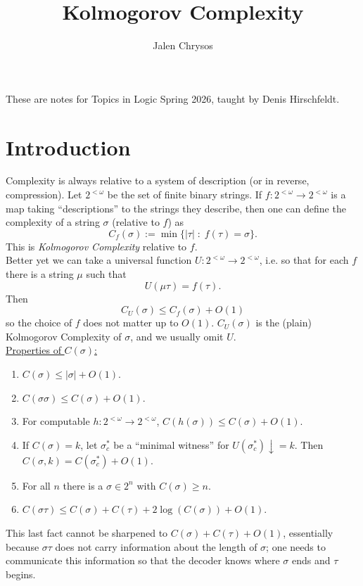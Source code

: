 \documentclass{amsart}
\title{Kolmogorov Complexity}
\author{Jalen Chrysos}
\begin{document}
	
	\maketitle
	
	These are notes for Topics in Logic Spring 2026, taught by Denis Hirschfeldt.
	
	\tableofcontents

	\newpage 
	
	\section{Introduction}
	
	Complexity is always relative to a system of description (or in reverse, compression). Let $2^{<\omega}$ be the set of finite binary strings. If $f:2^{<\omega}\to 2^{<\omega}$ is a map taking ``descriptions'' to the strings they describe, then one can define the complexity of a string $\sigma$ (relative to $f$) as 
	$$C_f(\sigma) := \min\{|\tau| \; : \; f(\tau) = \sigma\}.$$
	This is \textit{Kolmogorov Complexity} relative to $f$.\\
	
	Better yet we can take a universal function $U:2^{<\omega}\to 2^{<\omega}$, i.e. so that for each $f$ there is a string $\mu$ such that
	$$
	U(\mu \tau) = f(\tau).
	$$
	Then 
	$$
	C_U(\sigma) \leq C_f(\sigma) + O(1)
	$$
	so the choice of $f$ does not matter up to $O(1)$. $C_U(\sigma)$ is the (plain) Kolmogorov Complexity of $\sigma$, and we usually omit $U$.\\
	
	\underline{Properties of $C(\sigma)$:}
	\begin{enumerate}
		\item $C(\sigma) \leq |\sigma| + O(1)$.
		\item $C(\sigma \sigma) \leq C(\sigma) + O(1)$.
		\item For computable $h:2^{<\omega}\to 2^{<\omega}$, $C(h(\sigma))\leq C(\sigma) + O(1)$.
		\item If $C(\sigma) = k$, let $\sigma_c^*$ be a ``minimal witness'' for $U(\sigma_c^*)\downarrow =k$. Then $C(\sigma,k)=C(\sigma_c^*)+O(1)$.
		\item For all $n$ there is a $\sigma \in 2^n$ with $C(\sigma)\geq n$.
		\item $C(\sigma \tau) \leq C(\sigma) + C(\tau) + 2\log(C(\sigma)) + O(1)$.\\
	\end{enumerate}
	
	This last fact cannot be sharpened to $C(\sigma) + C(\tau) + O(1)$, essentially because $\sigma \tau$ does not carry information about the length of $\sigma$; one needs to communicate this information so that the decoder knows where $\sigma$ ends and $\tau$ begins.\\
	
\end{document}
